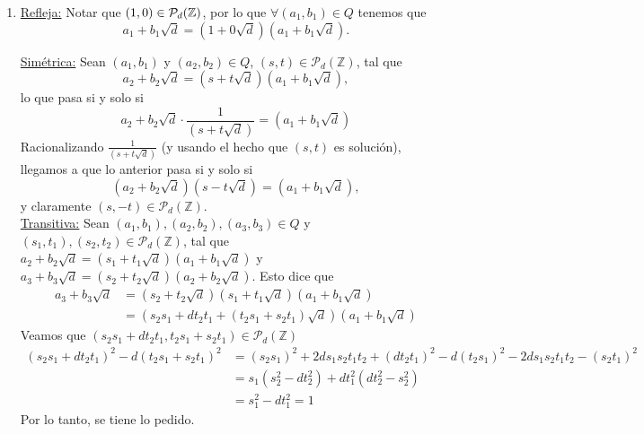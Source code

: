 \begin{sol}
	\begin{enumerate}[label = (\roman*)]
		\item \underline{Refleja:} Notar que $(1, 0) \in \mathcal{P}_d(\mathbb{Z})$, por lo que $\forall (a_1, b_1) \in Q$ tenemos que
		      $$a_1 + b_1\sqrt{d} = (1 + 0\sqrt{d})(a_1 + b_1 \sqrt{d}).$$

		      \underline{Simétrica:} Sean $(a_1, b_1)$ y $(a_2, b_2) \in Q$, $(s, t) \in \mathcal{P}_d(\mathbb{Z})$, tal que
		      $$a_2 + b_2\sqrt{d} = (s + t\sqrt{d})(a_1 + b_1\sqrt{d}),$$
		      lo que pasa si y solo si
		      $$a_2 + b_2\sqrt{d} \cdot \frac{1}{(s + t\sqrt{d})} = (a_1 + b_1\sqrt{d})$$
		      Racionalizando $\frac{1}{(s + t\sqrt{d})}$ (y usando el hecho que $(s, t)$ es solución), llegamos a que lo anterior pasa si y solo si
		      $$(a_2 + b_2 \sqrt{d})(s - t \sqrt{d}) = (a_1 + b_1 \sqrt{d}),$$
		      y claramente $(s, -t) \in \mathcal{P}_d (\mathbb{Z})$. \\

		      \underline{Transitiva:} Sean $(a_1, b_1), (a_2, b_2), (a_3, b_3) \in Q$ y $(s_1, t_1), (s_2, t_2) \in \mathcal{P}_d (\mathbb{Z})$, tal que
		      $a_2 + b_2\sqrt{d} = (s_1 + t_1\sqrt{d})(a_1 + b_1\sqrt{d})$ y $a_3 + b_3\sqrt{d} = (s_2 + t_2\sqrt{d})(a_2 + b_2\sqrt{d})$. Esto dice que
		      \begin{align*}
			      a_3 + b_3\sqrt{d} & = (s_2 + t_2\sqrt{d})(s_1 + t_1\sqrt{d})(a_1 + b_1\sqrt{d})         \\
			                        & = (s_2s_1 + dt_2t_1 + (t_2s_1 + s_2t_1)\sqrt{d})(a_1 + b_1\sqrt{d})
		      \end{align*}
		      Veamos que $(s_2s_1 + dt_2t_1, t_2s_1 + s_2t_1) \in \mathcal{P}_d (\mathbb{Z})$
		      \begin{align*}
			      (s_2s_1 + dt_2t_1)^2 - d(t_2s_1 + s_2t_1)^2 & = (s_2s_1)^2+ 2ds_1s_2t_1t_2 + (dt_2t_1)^2 - d(t_2s_1)^2 -2ds_1s_2t_1t_2 - (s_2t_1)^2 \\
			                                                  & = s_1(s_2^2 - dt_2^2) + dt_1^2(dt_2^2 - s_2^2)                                        \\
			                                                  & = s_1^2 - dt_1^2 = 1
		      \end{align*}
		      Por lo tanto, se tiene lo pedido.


\end{enumerate}
\end{sol}
